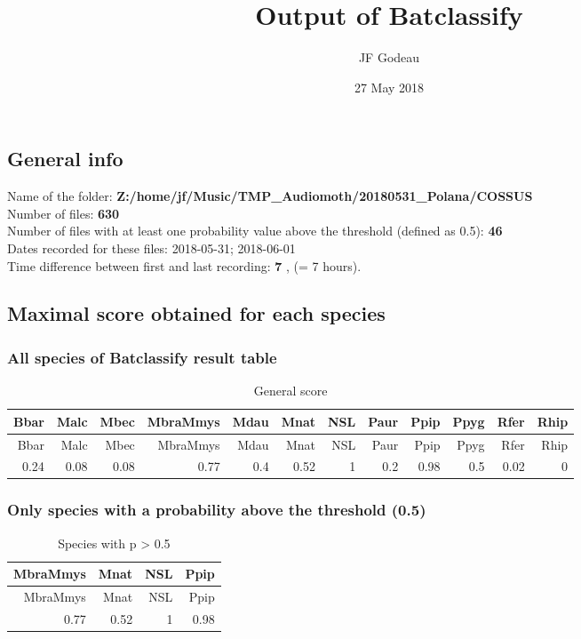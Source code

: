 \documentclass[]{article}
\title{Output of Batclassify}
\author{JF Godeau}
\date{27 May 2018}
\begin{document}
\maketitle

{
\setcounter{tocdepth}{2}
\tableofcontents
}
\subsection{General info}\label{general-info}

Name of the folder:
\textbf{Z:/home/jf/Music/TMP\_Audiomoth/20180531\_Polana/COSSUS}\\
Number of files: \textbf{630}\\
Number of files with at least one probability value above the threshold
(defined as 0.5): \textbf{46}\\
Dates recorded for these files: 2018-05-31; 2018-06-01\\
Time difference between first and last recording: \textbf{7} , (= 7
hours).

\subsection{Maximal score obtained for each
species}\label{maximal-score-obtained-for-each-species}

\subsubsection{All species of Batclassify result
table}\label{all-species-of-batclassify-result-table}

\begin{longtable}[]{@{}rrrrrrrrrrrr@{}}
\caption{General score}\tabularnewline
\toprule
Bbar & Malc & Mbec & MbraMmys & Mdau & Mnat & NSL & Paur & Ppip & Ppyg &
Rfer & Rhip\tabularnewline
\midrule
\endfirsthead
\toprule
Bbar & Malc & Mbec & MbraMmys & Mdau & Mnat & NSL & Paur & Ppip & Ppyg &
Rfer & Rhip\tabularnewline
\midrule
\endhead
0.24 & 0.08 & 0.08 & 0.77 & 0.4 & 0.52 & 1 & 0.2 & 0.98 & 0.5 & 0.02 &
0\tabularnewline
\bottomrule
\end{longtable}

\subsubsection{Only species with a probability above the threshold
(0.5)}\label{only-species-with-a-probability-above-the-threshold-0.5}

\begin{longtable}[]{@{}rrrr@{}}
\caption{Species with p \textgreater{} 0.5}\tabularnewline
\toprule
MbraMmys & Mnat & NSL & Ppip\tabularnewline
\midrule
\endfirsthead
\toprule
MbraMmys & Mnat & NSL & Ppip\tabularnewline
\midrule
\endhead
0.77 & 0.52 & 1 & 0.98\tabularnewline
\bottomrule
\end{longtable}
\end{document}
